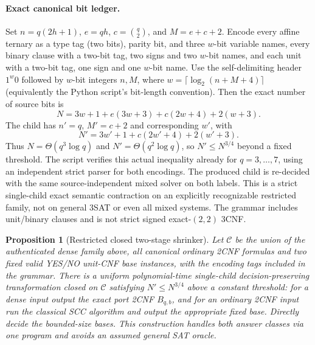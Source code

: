 \documentclass[11pt]{article}
\newtheorem{proposition}[theorem]{Proposition}
\begin{document}
\paragraph{Exact canonical bit ledger.} Set $n=q(2h+1)$, $e=qh$, $c=\binom q2$, and $M=e+c+2$. Encode every affine ternary as a type tag (two bits), parity bit, and three $w$-bit variable names, every binary clause with a two-bit tag, two signs and two $w$-bit names, and each unit with a two-bit tag, one sign and one $w$-bit name. Use the self-delimiting header $1^w0$ followed by $w$-bit integers $n,M$, where $w=\lceil\log_2(n+M+4)\rceil$ (equivalently the Python script's bit-length convention). Then the exact number of source bits is
\[
 N=3w+1+e(3w+3)+c(2w+4)+2(w+3). \tag{3}
\]
The child has $n'=q$, $M'=c+2$ and corresponding $w'$, with
\[
 N'=3w'+1+c(2w'+4)+2(w'+3). \tag{4}
\]
Thus $N=\Theta(q^3\log q)$ and $N'=\Theta(q^2\log q)$, so $N'\le N^{3/4}$ beyond a fixed threshold. The script verifies this actual inequality already for $q=3,\dots,7$, using an independent strict parser for both encodings. The produced child is re-decided with the same source-independent mixed solver on both labels. This is a strict single-child exact semantic contraction on an explicitly recognizable restricted family, not on general 3SAT or even all mixed systems. The grammar includes unit/binary clauses and is not strict signed exact-$(2,2)$ 3CNF.

\begin{proposition}[Restricted closed two-stage shrinker]
Let $\mathcal C$ be the union of the authenticated dense family above, all canonical ordinary 2CNF formulas and two fixed valid YES/NO unit-CNF base instances, with the encoding tags included in the grammar. There is a uniform polynomial-time single-child decision-preserving transformation closed on $\mathcal C$ satisfying $N'\le N^{3/4}$ above a constant threshold: for a dense input output the exact port 2CNF $B_{q,b}$, and for an ordinary 2CNF input run the classical SCC algorithm and output the appropriate fixed base. Directly decide the bounded-size bases. This construction handles both answer classes via one program and avoids an assumed general SAT oracle.
\end{proposition}
\end{document}
